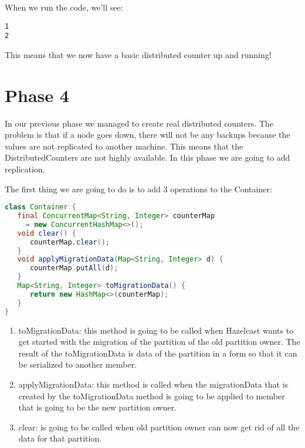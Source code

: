 When we run the code, we'll see:
\begin{lstlisting}
1
2
\end{lstlisting}
This means that we now have a basic distributed counter up and running!

\section{Phase 4}
In our previous phase we managed to create real distributed counters. The problem is that if a node goes down, there will not be any backups because the values are not replicated to another machine. This means that the DistributedCounters are not highly available. In this phase we are going to add replication.

The first thing we are going to do is to add 3 operations to the Container:
\begin{lstlisting}[language=java]
class Container {
   final ConcurrentMap<String, Integer> counterMap 
     = new ConcurrentHashMap<>();
   void clear() {
      counterMap.clear();
   }
   void applyMigrationData(Map<String, Integer> d) {
      counterMap.putAll(d);
   }
   Map<String, Integer> toMigrationData() {
      return new HashMap<>(counterMap);
   }
}
\end{lstlisting}
\begin{enumerate}
\item toMigrationData: this method is going to be called when Hazelcast wants to get started with the migration of the partition of the old partition owner. The result of the toMigrationData is data of the partition in a form so that it can be serialized to another member.
\item applyMigrationData: this method is called when the migrationData that is created by the toMigrationData method is going to be applied to member that is going to be the new partition owner.
\item clear: is going to be called when old partition owner can now get rid of all the data for that partition. 
\end{enumerate}


